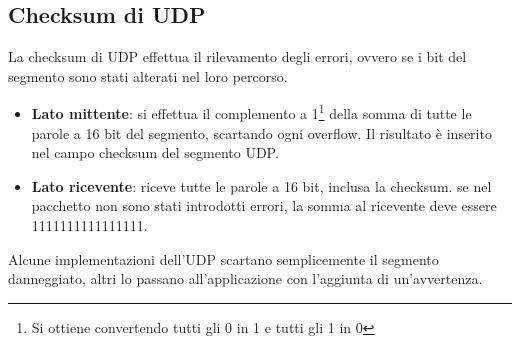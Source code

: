 \documentclass[11pt,a4paper]{book}
\begin{document}
\subsection{Checksum di UDP}
La checksum di UDP effettua il rilevamento degli errori, ovvero se i bit del segmento sono stati alterati nel loro percorso. \\
\begin{itemize}
	\item \textbf{Lato mittente}: si effettua il complemento a 1\footnote{Si ottiene convertendo tutti gli 0 in 1 e tutti gli 1 in 0} della somma di tutte le parole a 16 bit del segmento, scartando ogni overflow. Il risultato è inserito nel campo checksum del segmento UDP.
	\item \textbf{Lato ricevente}: riceve tutte le parole a 16 bit, inclusa la checksum. se nel pacchetto non sono stati introdotti errori, la somma al ricevente deve essere 1111111111111111. \\
\end{itemize}
Alcune implementazioni dell'UDP scartano semplicemente il segmento danneggiato, altri lo passano all'applicazione con l'aggiunta di un'avvertenza.
\end{document}
